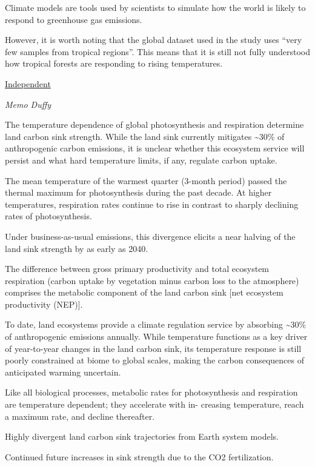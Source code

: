 \documentclass[
]{book}
\begin{document}
Climate models are tools used by scientists to simulate how the world is likely to respond to greenhouse gas emissions.

However, it is worth noting that the global dataset used in the study
uses ``very few samples from tropical regions''.
This means that it is still not fully understood how tropical forests
are responding to rising temperatures.

\href{https://www.independent.co.uk/environment/climate-change/land-ecosystems-tipping-point-temperature-b1786822.html}{Independent}

\emph{Memo Duffy}

The temperature dependence of global photosynthesis and respiration
determine land carbon sink strength.
While the land sink currently mitigates \textasciitilde30\% of anthropogenic carbon emissions,
it is unclear whether this ecosystem service will persist and
what hard temperature limits, if any, regulate carbon uptake.

The mean temperature of the warmest quarter (3-month period)
passed the thermal maximum for photosynthesis during the past decade.
At higher temperatures, respiration rates continue to rise
in contrast to sharply declining rates of photosynthesis.

Under business-as-usual emissions, this divergence elicits a
near halving of the land sink strength by as early as 2040.

The difference between gross primary productivity
and total ecosystem respiration
(carbon uptake by vegetation minus carbon loss to the atmosphere)
comprises the metabolic component of the land carbon
sink {[}net ecosystem productivity (NEP){]}.

To date, land ecosystems provide a climate regulation service
by absorbing \textasciitilde30\% of anthropogenic emissions annually.
While temperature functions as a key driver
of year-to-year changes in the land carbon sink,
its temperature response is still poorly constrained at biome to global scales,
making the carbon consequences of anticipated warming uncertain.

Like all biological processes, metabolic rates for photosynthesis
and respiration are temperature dependent; they accelerate with in-
creasing temperature, reach a maximum rate, and decline thereafter.

Highly divergent land carbon sink trajectories from Earth system models.

Continued future increases in sink strength due to the CO2 fertilization.
\end{document}
